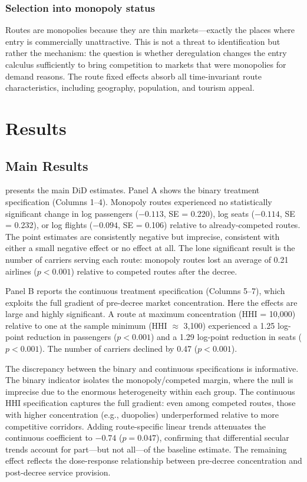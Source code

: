\documentclass[12pt]{article}
\begin{document}
\subsubsection*{Selection into monopoly status} Routes are monopolies because they are thin markets---exactly the places where entry is commercially unattractive. This is not a threat to identification but rather the mechanism: the question is whether deregulation changes the entry calculus sufficiently to bring competition to markets that were monopolies for demand reasons. The route fixed effects absorb all time-invariant route characteristics, including geography, population, and tourism appeal.


\section{Results}

\subsection{Main Results}

 presents the main DiD estimates. Panel A shows the binary treatment specification (Columns 1--4). Monopoly routes experienced no statistically significant change in log passengers ($-0.113$, SE = 0.220), log seats ($-0.114$, SE = 0.232), or log flights ($-0.094$, SE = 0.106) relative to already-competed routes. The point estimates are consistently negative but imprecise, consistent with either a small negative effect or no effect at all. The lone significant result is the number of carriers serving each route: monopoly routes lost an average of 0.21 airlines ($p < 0.001$) relative to competed routes after the decree.

Panel B reports the continuous treatment specification (Columns 5--7), which exploits the full gradient of pre-decree market concentration. Here the effects are large and highly significant. A route at maximum concentration (HHI = 10,000) relative to one at the sample minimum (HHI $\approx$ 3,100) experienced a 1.25 log-point reduction in passengers ($p < 0.001$) and a 1.29 log-point reduction in seats ($p < 0.001$). The number of carriers declined by 0.47 ($p < 0.001$).

The discrepancy between the binary and continuous specifications is informative. The binary indicator isolates the monopoly/competed margin, where the null is imprecise due to the enormous heterogeneity within each group. The continuous HHI specification captures the full gradient: even among competed routes, those with higher concentration (e.g., duopolies) underperformed relative to more competitive corridors. Adding route-specific linear trends attenuates the continuous coefficient to $-0.74$ ($p = 0.047$), confirming that differential secular trends account for part---but not all---of the baseline estimate. The remaining effect reflects the dose-response relationship between pre-decree concentration and post-decree service provision.
\end{document}
